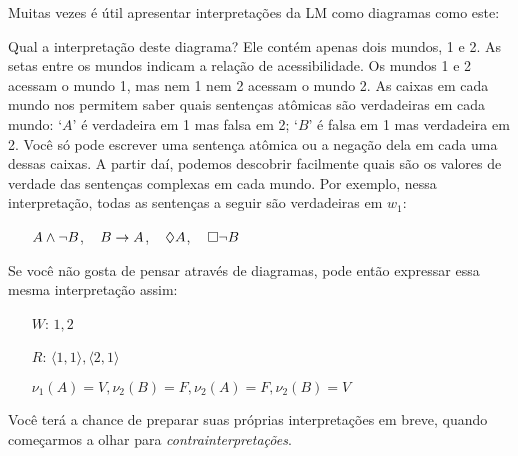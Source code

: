  Muitas vezes é útil apresentar interpretações da LM como diagramas como este:
\begin{center}
\end{center}
Qual a interpretação deste diagrama? Ele contém apenas dois mundos, 1 e 2. As setas entre os mundos indicam a relação de acessibilidade. Os mundos 1 e 2 acessam o mundo 1, mas nem 1 nem 2 acessam o mundo 2. As caixas em cada mundo nos permitem saber quais sentenças atômicas são verdadeiras em cada mundo: `$A$' é verdadeira em 1 mas  falsa em 2; `$B$' é falsa em 1 mas verdadeira em 2. Você só pode escrever uma sentença atômica ou a negação dela  em cada uma dessas caixas. A partir daí, podemos descobrir facilmente quais são os valores de verdade das sentenças complexas em cada mundo. Por exemplo, nessa interpretação, todas as sentenças a seguir são verdadeiras em $w_1$: 
 
\begin{itemize}
	\item[]$A\wedge\neg B$, \,\,\, $B\rightarrow A$, \,\,\, $\Diamond A$, \,\,\, $\Box\neg B$
\end{itemize}
Se você não gosta de pensar através de diagramas, pode então expressar essa mesma interpretação assim:
\begin{itemize}
	\item[$W$:]$1,2$
	\item[$R$:]$\langle 1,1\rangle, \langle 2,1\rangle$
	\item[]$\nu_{1}(A)=V, \nu_{2}(B)=F, \nu_{2}(A)=F, \nu_{2}(B)=V$
\end{itemize}
Você terá a chance de preparar suas próprias interpretações 
em breve, quando começarmos a olhar para \emph{contrainterpretações}.



